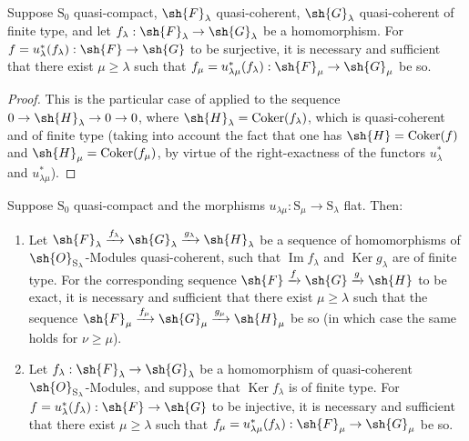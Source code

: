 \begin{corollary}[8.5.7]
\label{IV.8.5.7}
Suppose $\mathrm{S}_0$ quasi-compact, $\sh{F}_\lambda$ quasi-coherent, $\sh{G}_\lambda$ quasi-coherent of finite type, and let $f_\lambda:\sh{F}_\lambda\to\sh{G}_\lambda$ be a homomorphism.
For $f=u_\lambda^*(f_\lambda):\sh{F}\to\sh{G}$ to be surjective, it is necessary and sufficient that there exist $\mu\geqslant\lambda$ such that $f_\mu=u_{\lambda\mu}^*(f_\lambda):\sh{F}_\mu\to\sh{G}_\mu$ be so.
\end{corollary}

\begin{proof}
This is the particular case of  applied to the sequence $0\to\sh{H}_\lambda\to 0\to 0$, where $\sh{H}_\lambda=\operatorname{Coker}(f_\lambda)$, which is quasi-coherent and of finite type (taking into account the fact that one has $\sh{H}=\operatorname{Coker}(f)$ and $\sh{H}_\mu=\operatorname{Coker}(f_\mu)$, by virtue of the right-exactness of the functors $u_\lambda^*$ and $u_{\lambda\mu}^*$).
\end{proof}

\begin{corollary}[8.5.8]
\label{IV.8.5.8}
Suppose $\mathrm{S}_0$ quasi-compact and the morphisms $u_{\lambda\mu}:\mathrm{S}_\mu\to\mathrm{S}_\lambda$ flat.
Then:
\begin{enumerate}[label=(\roman*)]
  \item Let $\sh{F}_\lambda\xrightarrow{f_\lambda}\sh{G}_\lambda\xrightarrow{g_\lambda}\sh{H}_\lambda$ be a sequence of homomorphisms of $\sh{O}_{\mathrm{S}_\lambda}$-Modules quasi-coherent, such that $\operatorname{Im} f_\lambda$ and $\operatorname{Ker} g_\lambda$ are of finite type.
For the corresponding sequence $\sh{F}\xrightarrow{f}\sh{G}\xrightarrow{g}\sh{H}$ to be
exact, it is necessary and sufficient that there exist $\mu\geqslant\lambda$ such that the sequence $\sh{F}_\mu\xrightarrow{f_\mu}\sh{G}_\mu\xrightarrow{g_\mu}\sh{H}_\mu$ be so (in which case the same holds for $\nu\geqslant\mu$).
  \item Let $f_\lambda:\sh{F}_\lambda\to\sh{G}_\lambda$ be a homomorphism of quasi-coherent $\sh{O}_{\mathrm{S}_\lambda}$-Modules, and suppose that $\operatorname{Ker} f_\lambda$ is of finite type.
For $f=u_\lambda^*(f_\lambda):\sh{F}\to\sh{G}$ to be injective, it is necessary and sufficient that there exist $\mu\geqslant\lambda$ such that $f_\mu=u_{\lambda\mu}^*(f_\lambda):\sh{F}_\mu\to\sh{G}_\mu$ be so.
\end{enumerate}
\end{corollary}

